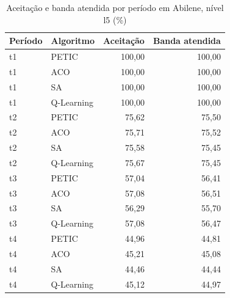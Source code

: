 \begin{table}[htb]
    \centering
    \scriptsize
    \caption{Aceitação e banda atendida por período em Abilene, nível l5 (\%)}
    \label{tab:periodos-abilene-l5}
    \begin{tabular}{llrr}
        \hline
        Período & Algoritmo & Aceitação & Banda atendida \\
        \hline
        t1 & PETIC & 100,00 & 100,00 \\
        t1 & ACO & 100,00 & 100,00 \\
        t1 & SA & 100,00 & 100,00 \\
        t1 & Q-Learning & 100,00 & 100,00 \\
        t2 & PETIC & 75,62 & 75,50 \\
        t2 & ACO & 75,71 & 75,52 \\
        t2 & SA & 75,58 & 75,45 \\
        t2 & Q-Learning & 75,67 & 75,45 \\
        t3 & PETIC & 57,04 & 56,41 \\
        t3 & ACO & 57,08 & 56,51 \\
        t3 & SA & 56,29 & 55,70 \\
        t3 & Q-Learning & 57,08 & 56,47 \\
        t4 & PETIC & 44,96 & 44,81 \\
        t4 & ACO & 45,21 & 45,08 \\
        t4 & SA & 44,46 & 44,44 \\
        t4 & Q-Learning & 45,12 & 44,97 \\
        \hline
    \end{tabular}
\end{table}


